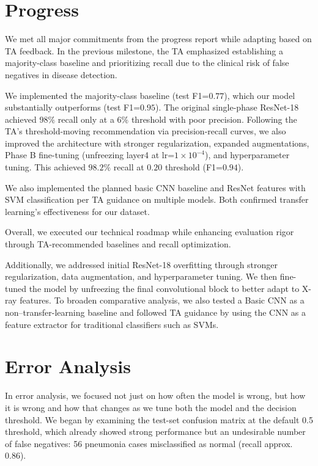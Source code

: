\documentclass[11pt]{article}
\begin{document}
\section{Progress}
We met all major commitments from the progress report while adapting based on TA feedback. In the previous milestone, the TA emphasized establishing a majority-class baseline and prioritizing recall due to the clinical risk of false negatives in disease detection.

We implemented the majority-class baseline (test F1=$0.77$), which our model substantially outperforms (test F1=$0.95$). The original single-phase ResNet-18 achieved $98\%$ recall only at a $6\%$ threshold with poor precision. Following the TA's threshold-moving recommendation via precision-recall curves, we also improved the architecture with stronger regularization, expanded augmentations, Phase B fine-tuning (unfreezing layer4 at lr=$1 \times 10^{-4}$), and hyperparameter tuning. This achieved $98.2\%$ recall at $0.20$ threshold (F1=$0.94$).

We also implemented the planned basic CNN baseline and ResNet features with SVM classification per TA guidance on multiple models. Both confirmed transfer learning's effectiveness for our dataset.

Overall, we executed our technical roadmap while enhancing evaluation rigor through TA-recommended baselines and recall optimization.


Additionally, we addressed initial ResNet-18 overfitting through stronger regularization, data augmentation, and hyperparameter tuning. We then fine-tuned the model by unfreezing the final convolutional block to better adapt to X-ray features. To broaden comparative analysis, we also tested a Basic CNN as a non–transfer-learning baseline and followed TA guidance by using the CNN as a feature extractor for traditional classifiers such as SVMs.


\section{Error Analysis}
In error analysis, we focused not just on how often the model is wrong, but how it is wrong and how that changes as we tune both the model and the decision threshold. We began by examining the test-set confusion matrix at the default 0.5 threshold, which already showed strong performance but an undesirable number of false negatives: 56 pneumonia cases misclassified as normal (recall approx.  0.86). 
\end{document}
